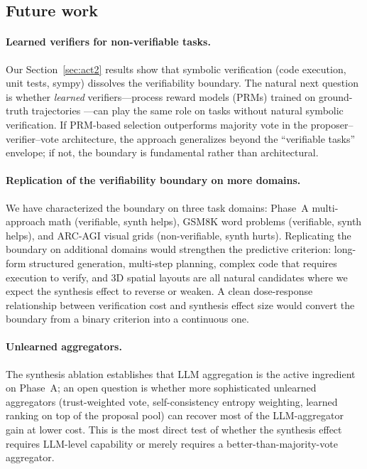 \documentclass[11pt]{amsart}
\newcommand\1{{\mathds{1}}}
\theoremstyle{definition}
\theoremstyle{remark}
\numberwithin{equation}{section}
\begin{document}
\subsection{Future work}\label{sec:future}

\paragraph{Learned verifiers for non-verifiable tasks.}
Our Section~\ref{sec:act2} results show that symbolic verification (code execution, unit tests, sympy) dissolves the verifiability boundary.
The natural next question is whether \emph{learned} verifiers---process reward models (PRMs) trained on ground-truth trajectories \cite{Lightman2023PRM}---can play the same role on tasks without natural symbolic verification.
If PRM-based selection outperforms majority vote in the proposer--verifier--vote architecture, the approach generalizes beyond the ``verifiable tasks'' envelope; if not, the boundary is fundamental rather than architectural.

\paragraph{Replication of the verifiability boundary on more domains.}
We have characterized the boundary on three task domains: Phase~A multi-approach math (verifiable, synth helps), GSM8K word problems (verifiable, synth helps), and ARC-AGI visual grids (non-verifiable, synth hurts).
Replicating the boundary on additional domains would strengthen the predictive criterion: long-form structured generation, multi-step planning, complex code that requires execution to verify, and 3D spatial layouts are all natural candidates where we expect the synthesis effect to reverse or weaken.
A clean dose-response relationship between verification cost and synthesis effect size would convert the boundary from a binary criterion into a continuous one.

\paragraph{Unlearned aggregators.}
The synthesis ablation establishes that LLM aggregation is the active ingredient on Phase~A; an open question is whether more sophisticated unlearned aggregators (trust-weighted vote, self-consistency entropy weighting, learned ranking on top of the proposal pool) can recover most of the LLM-aggregator gain at lower cost.
This is the most direct test of whether the synthesis effect requires LLM-level capability or merely requires a better-than-majority-vote aggregator.
\end{document}
